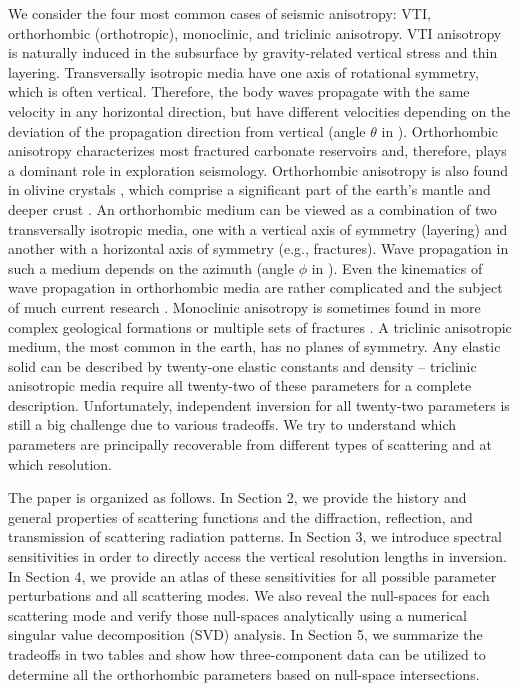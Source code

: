 We consider the four most common cases of seismic anisotropy: VTI, orthorhombic (orthotropic), monoclinic, and triclinic anisotropy.
VTI anisotropy is naturally induced in the subsurface by gravity-related vertical stress \citep{thomsen1986} and thin layering.
%
Transversally isotropic media have one axis of rotational symmetry, which is often vertical. Therefore, the body waves propagate with the same velocity in any horizontal direction, but have different velocities depending on the deviation of the propagation direction from vertical (angle $\theta$ in ).
Orthorhombic anisotropy characterizes most fractured carbonate reservoirs \citep{schoenberg1997,tsvankin1997} and, therefore, plays a dominant role in exploration seismology. Orthorhombic anisotropy is also found in olivine crystals \citep{durham1977}, which comprise a significant part of the earth's mantle and deeper crust \citep[e.g.][]{tommasi2009}.
% 
An orthorhombic medium can be viewed as a combination of two transversally isotropic media, one with a vertical axis of symmetry (layering) and another with a horizontal axis of symmetry (e.g., fractures). Wave propagation in such a medium depends on the azimuth (angle $\phi$ in ).
% 
Even the kinematics of wave propagation in orthorhombic media are rather complicated and the subject of much current research \citep{stovas2015,stovas2017,ivanov2016,xu2018}. Monoclinic anisotropy is sometimes found in more complex geological formations or multiple sets of fractures \citep{grechka2000}. A triclinic anisotropic medium, the most common in the earth, has no planes of symmetry. Any elastic solid can be described by twenty-one elastic constants and density -- triclinic anisotropic media require all twenty-two of these parameters for a complete description. Unfortunately, independent inversion for all twenty-two parameters is still a big challenge \citep{kohn2015} due to various tradeoffs. We try to understand which parameters are principally recoverable from different types of scattering and at which resolution.

The paper is organized as follows. 
In Section 2, we provide the history and general properties of scattering functions and the diffraction, reflection, and transmission of scattering radiation patterns. In Section 3, we introduce spectral sensitivities in order to directly access the vertical resolution lengths in inversion. In Section 4, we provide an atlas of these sensitivities for all possible parameter perturbations and all scattering modes. We also reveal the null-spaces for each scattering mode and verify those null-spaces analytically using a numerical singular value decomposition (SVD) analysis. In Section 5, we summarize the tradeoffs in two tables and show how three-component data can be utilized to determine all the orthorhombic parameters based on null-space intersections.

